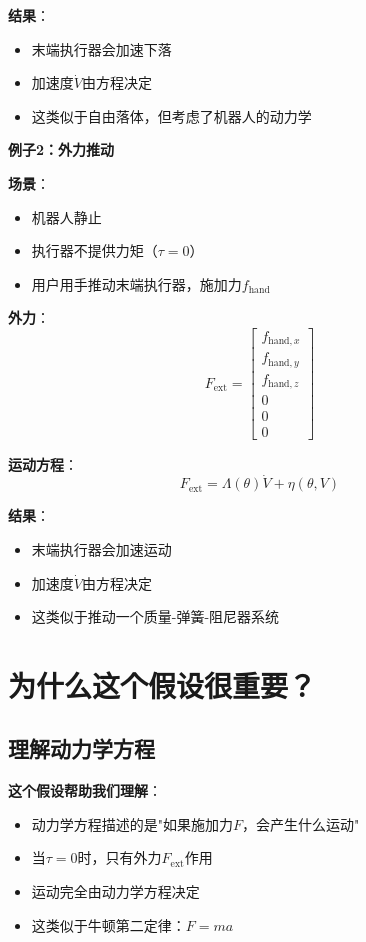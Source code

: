 \documentclass[12pt,a4paper]{article}
\begin{document}
\textbf{结果}：
\begin{itemize}
\item 末端执行器会加速下落
\item 加速度$\dot{V}$由方程决定
\item 这类似于自由落体，但考虑了机器人的动力学
\end{itemize}

\textbf{例子2：外力推动}

\textbf{场景}：
\begin{itemize}
\item 机器人静止
\item 执行器不提供力矩（$\tau = 0$）
\item 用户用手推动末端执行器，施加力$f_{\text{hand}}$
\end{itemize}

\textbf{外力}：
\begin{equation}
F_{\text{ext}} = \begin{bmatrix} f_{\text{hand},x} \\ f_{\text{hand},y} \\ f_{\text{hand},z} \\ 0 \\ 0 \\ 0 \end{bmatrix}
\end{equation}

\textbf{运动方程}：
\begin{equation}
F_{\text{ext}} = \Lambda(\theta)\dot{V} + \eta(\theta, V)
\end{equation}

\textbf{结果}：
\begin{itemize}
\item 末端执行器会加速运动
\item 加速度$\dot{V}$由方程决定
\item 这类似于推动一个质量-弹簧-阻尼器系统
\end{itemize}

\section{为什么这个假设很重要？}

\subsection{理解动力学方程}

\textbf{这个假设帮助我们理解}：
\begin{itemize}
\item 动力学方程描述的是"如果施加力$F$，会产生什么运动"
\item 当$\tau = 0$时，只有外力$F_{\text{ext}}$作用
\item 运动完全由动力学方程决定
\item 这类似于牛顿第二定律：$F = ma$
\end{itemize}
\end{document}
